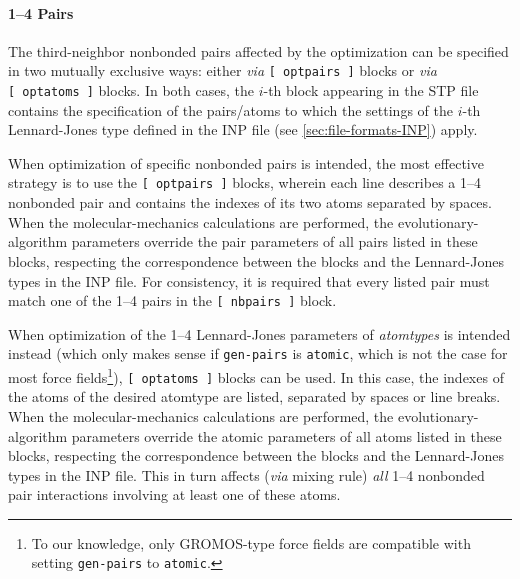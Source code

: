 \documentclass[10pt,a4paper,openany]{memoir}
\numberwithin{equation}{section}
\begin{document}

\paragraph{1--4 Pairs}

The third-neighbor nonbonded pairs affected by the optimization can be specified
in two mutually exclusive ways: either \textit{via} \texttt{[~optpairs~]} blocks
or \textit{via} \texttt{[~optatoms~]} blocks. In both cases, the $i$-th block
appearing in the STP file contains the specification of the pairs/atoms to which
the settings of the $i$-th Lennard-Jones type defined in the INP file (see
\autoref{sec:file-formats-INP}) apply.

When optimization of specific nonbonded pairs is intended, the most effective
strategy is to use the \texttt{[~optpairs~]} blocks, wherein each line describes
a 1--4 nonbonded pair and contains the indexes of its two atoms separated by
spaces.  When the molecular-mechanics calculations are performed, the
evolutionary-algorithm parameters override the pair parameters of all pairs
listed in these blocks, respecting the correspondence between the blocks and the
Lennard-Jones types in the INP file.  For consistency, it is required that every
listed pair must match one of the 1--4 pairs in the \texttt{[~nbpairs~]} block.

When optimization of the 1--4 Lennard-Jones parameters of
\textit{atomtypes} is intended instead (which only makes sense if
\texttt{gen-pairs} is \texttt{atomic}, which is not the case for most
force fields\footnote{To our knowledge, only GROMOS-type force fields
  are compatible with setting \texttt{gen-pairs} to
  \texttt{atomic}.}), \texttt{[~optatoms~]} blocks can be used.  In
this case, the indexes of the atoms of the desired atomtype are
listed, separated by spaces or line breaks.  When the
molecular-mechanics calculations are performed, the
evolutionary-algorithm parameters override the atomic parameters of
all atoms listed in these blocks, respecting the correspondence
between the blocks and the Lennard-Jones types in the INP file.  This
in turn affects (\textit{via} mixing rule) \textit{all} 1--4 nonbonded
pair interactions involving at least one of these atoms.
\end{document}

